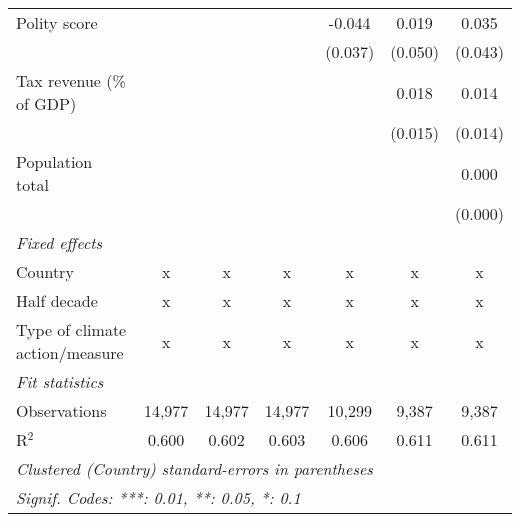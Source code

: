\begin{tabular}{lcccccc}
   Polity score                                          &              &                &                & -0.044         & 0.019          & 0.035\\   
                                                         &              &                &                & (0.037)        & (0.050)        & (0.043)\\   
   Tax revenue (\% of GDP)                               &              &                &                &                & 0.018          & 0.014\\   
                                                         &              &                &                &                & (0.015)        & (0.014)\\   
   Population total                                      &              &                &                &                &                & 0.000\\   
                                                         &              &                &                &                &                & (0.000)\\   
   \emph{Fixed effects}\\
   Country                                               & x            & x              & x              & x              & x              & x\\  
   Half decade                                           & x            & x              & x              & x              & x              & x\\  
   Type of climate action/measure                        & x            & x              & x              & x              & x              & x\\  
   \midrule \emph{Fit statistics}\\
   Observations                                          & 14,977       & 14,977         & 14,977         & 10,299         & 9,387          & 9,387\\  
   R$^2$                                                 & 0.600        & 0.602          & 0.603          & 0.606          & 0.611          & 0.611\\  
   \midrule
   \multicolumn{7}{l}{\emph{Clustered (Country) standard-errors in parentheses}}\\
   \multicolumn{7}{l}{\emph{Signif. Codes: ***: 0.01, **: 0.05, *: 0.1}}\\
\end{tabular}
\par\endgroup


